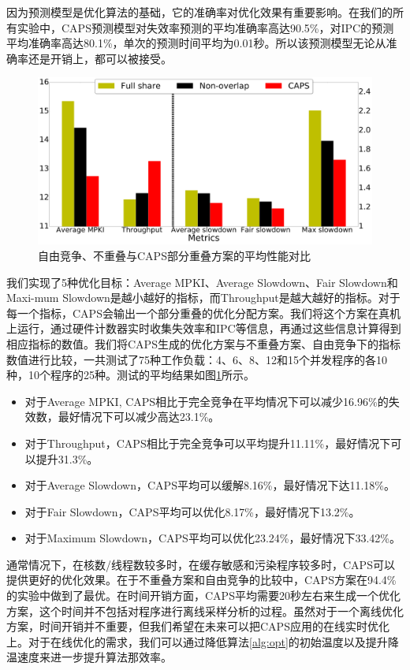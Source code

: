 因为预测模型是优化算法的基础，它的准确率对优化效果有重要影响。在我们的所有实验中，CAPS预测模型对失效率预测的平均准确率高达90.5\%，对IPC的预测平均准确率高达80.1\%，单次的预测时间平均为0.01秒。所以该预测模型无论从准确率还是开销上，都可以被接受。

\begin{figure}[htbp]
\centering
\includegraphics[width=0.9\columnwidth]{figures/avg_analysis.pdf}
\caption{自由竞争、不重叠与CAPS部分重叠方案的平均性能对比}
\label{fig:avg_an}
\end{figure} 

我们实现了5种优化目标：Average MPKI、Average Slowdown、Fair Slowdown和Maxi-mum Slowdown是越小越好的指标，而Throughput是越大越好的指标。对于每一个指标，CAPS会输出一个部分重叠的优化分配方案。我们将这个方案在真机上运行，通过硬件计数器实时收集失效率和IPC等信息，再通过这些信息计算得到相应指标的数值。我们将CAPS生成的优化方案与不重叠方案、自由竞争下的指标数值进行比较，一共测试了75种工作负载：4、6、8、12和15个并发程序的各10种，10个程序的25种。测试的平均结果如图\ref{fig:avg_an}所示。

\begin{itemize}
    \item 对于Average MPKI, CAPS相比于完全竞争在平均情况下可以减少16.96\%的失效数，最好情况下可以减少高达23.1\%。
    \item 对于Throughput，CAPS相比于完全竞争可以平均提升11.11\%，最好情况下可以提升31.3\%。
    \item 对于Average Slowdown，CAPS平均可以缓解8.16\%，最好情况下达11.18\%。
    \item 对于Fair Slowdown，CAPS平均可以优化8.17\%，最好情况下13.2\%。
    \item 对于Maximum Slowdown，CAPS平均可以优化23.24\%，最好情况下33.42\%。
\end{itemize}

通常情况下，在核数/线程数较多时，在缓存敏感和污染程序较多时，CAPS可以提供更好的优化效果。在于不重叠方案和自由竞争的比较中，CAPS方案在94.4\%的实验中做到了最优。在时间开销方面，CAPS平均需要20秒左右来生成一个优化方案，这个时间并不包括对程序进行离线采样分析的过程。虽然对于一个离线优化方案，时间开销并不重要，但我们希望在未来可以把CAPS应用的在线实时优化上。对于在线优化的需求，我们可以通过降低算法\ref{alg:opt}的初始温度以及提升降温速度来进一步提升算法那效率。


